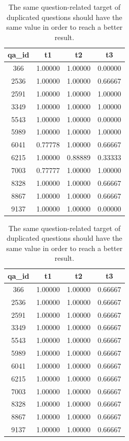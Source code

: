     \begin{table}
        \centering
        \caption{The same question-related target of duplicated questions should have the same value in order to reach a better result.}
        \label{tbl:dp_before}
        \begin{minipage}{0.48\linewidth}
        \begin{tabular}{cccc}
            \hline
            qa_id	&t1 &t2 &t3 \\
            \hline
            366	    &1.00000 &1.00000 &0.00000\\
            2536	&1.00000 &1.00000 &0.66667\\
            2591	&1.00000 &1.00000 &1.00000\\
            3349	&1.00000 &1.00000 &1.00000\\
            5543	&1.00000 &1.00000 &0.00000\\
            5989	&1.00000 &1.00000 &1.00000\\
            6041	&0.77778 &1.00000 &0.66667\\
            6215	&1.00000 &0.88889 &0.33333\\
            7003	&0.77777 &1.00000 &1.00000\\
            8328	&1.00000 &1.00000 &0.66667\\
            8867	&1.00000 &1.00000 &0.66667\\
            9137	&1.00000 &1.00000 &0.00000\\
            \hline
        \end{tabular}
    \end{minipage}
    \begin{minipage}{0.48\linewidth}
        \begin{tabular}{cccc}
            \hline
            qa_id	&t1 &t2 &t3 \\
            \hline
            366	    &1.00000 &1.00000 &0.66667\\
            2536	&1.00000 &1.00000 &0.66667\\
            2591	&1.00000 &1.00000 &0.66667\\
            3349	&1.00000 &1.00000 &0.66667\\
            5543	&1.00000 &1.00000 &0.66667\\
            5989	&1.00000 &1.00000 &0.66667\\
            6041	&1.00000 &1.00000 &0.66667\\
            6215	&1.00000 &1.00000 &0.66667\\
            7003	&1.00000 &1.00000 &0.66667\\
            8328	&1.00000 &1.00000 &0.66667\\
            8867	&1.00000 &1.00000 &0.66667\\
            9137	&1.00000 &1.00000 &0.66667\\
            \hline
        \end{tabular}
    \end{minipage}
    \end{table}

